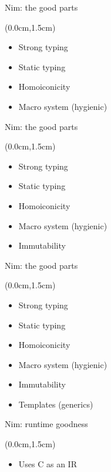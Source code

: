 \documentclass[xetex,14pt,aspectratio=169]{beamer}
\begin{document}
\begin{frame}{Nim: the good parts}
\begin{textblock*}{\framewidth-0.8cm}(0.0cm,1.5cm) %
\begin{itemize}
  \item Strong typing
  \item Static typing
  \item Homoiconicity
  \item Macro system (hygienic)
\end{itemize}
\end{textblock*}
\end{frame}

\begin{frame}{Nim: the good parts}
\begin{textblock*}{\framewidth-0.8cm}(0.0cm,1.5cm) %
\begin{itemize}
  \item Strong typing
  \item Static typing
  \item Homoiconicity
  \item Macro system (hygienic)
  \item Immutability
\end{itemize}
\end{textblock*}
\end{frame}

\begin{frame}{Nim: the good parts}
\begin{textblock*}{\framewidth-0.8cm}(0.0cm,1.5cm) %
\begin{itemize}
  \item Strong typing
  \item Static typing
  \item Homoiconicity
  \item Macro system (hygienic)
  \item Immutability
  \item Templates (generics)
\end{itemize}
\end{textblock*}
\end{frame}

\begin{frame}{Nim: runtime goodness}
\begin{textblock*}{\framewidth-0.8cm}(0.0cm,1.5cm) %
\begin{itemize}
  \item Uses C as an IR
\end{itemize}
\end{textblock*}
\end{frame}
\end{document}
